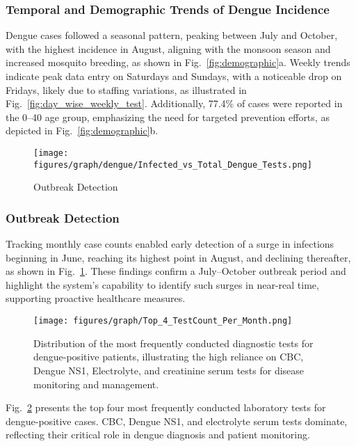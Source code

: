 \subsubsection{Temporal and Demographic Trends of Dengue Incidence}
Dengue cases followed a seasonal pattern, peaking between July and October, with the highest incidence in August, aligning with the monsoon season and increased mosquito breeding, as shown in Fig.~\ref{fig:demographic}a. Weekly trends indicate peak data entry on Saturdays and Sundays, with a noticeable drop on Fridays, likely due to staffing variations, as illustrated in Fig.~\ref{fig:day_wise_weekly_test}. Additionally, 77.4\% of cases were reported in the 0–40 age group, emphasizing the need for targeted prevention efforts, as depicted in Fig.~\ref{fig:demographic}b.
\begin{figure}[]
    \vspace{-3.5mm}
    \centering
    \texttt{[image: figures/graph/dengue/Infected\_vs\_Total\_Dengue\_Tests.png]}
    \caption{Outbreak Detection}
    \label{fig:outbreak-detection}
    \vspace{-6mm}
\end{figure}
\subsubsection{Outbreak Detection}
Tracking monthly case counts enabled early detection of a surge in infections beginning in June, reaching its highest point in August, and declining thereafter, as shown in Fig.~\ref{fig:outbreak-detection}. These findings confirm a July–October outbreak period and highlight the system’s capability to identify such surges in near-real time, supporting proactive healthcare measures.

\begin{figure}[]
    \vspace{-3.5mm}
    \centering
    \texttt{[image: figures/graph/Top\_4\_TestCount\_Per\_Month.png]}
    \caption{Distribution of the most frequently conducted diagnostic tests for dengue-positive patients, illustrating the high reliance on CBC, Dengue NS1, Electrolyte, and creatinine serum tests for disease monitoring and management.}
    \label{fig:dengue-test-count}
    \vspace{-6mm}
\end{figure}
Fig.~\ref{fig:dengue-test-count} presents the top four most frequently conducted laboratory tests for dengue-positive cases. CBC, Dengue NS1, and electrolyte serum tests dominate, reflecting their critical role in dengue diagnosis and patient monitoring.





